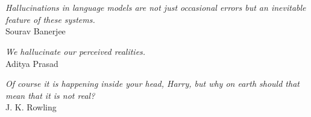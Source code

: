 
\chapter*{}
\vspace{15cm}
\begin{flushright}
    \textit{Hallucinations in language models are not just occasional errors but an inevitable feature of these systems.}
    \medskip\\
    Sourav Banerjee

    \textit{We hallucinate our perceived realities.}
    \medskip\\
    Aditya Prasad
    
    \textit{Of course it is happening inside your head, Harry, but why on earth should that mean that it is not real?}
    \medskip\\
    J. K. Rowling

\end{flushright}
